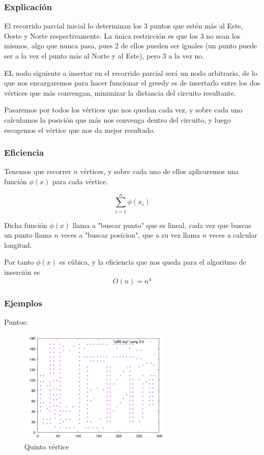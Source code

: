 \subsubsection{Explicación}
El recorrido parcial inicial lo determinan los 3 puntos que estén más al Este, Oeste y Norte respectivamente. La única restricción es que los 3 no sean los mismos, algo que nunca pasa, pues 2 de ellos pueden ser iguales (un punto puede ser a la vez el punto más al Norte y al Este), pero 3 a la vez no.

EL nodo siguiente a insertar en el recorrido parcial será un nodo arbitrario, de lo que nos encargaremos para hacer funcionar el greedy es de insertarlo entre los dos vértices que más convengan, minimizar la distancia del circuito resultante.

Pasaremos por todos los vértices que nos quedan cada vez, y sobre cada uno calculamos la posición que más nos convenga dentro del circuito, y luego escogemos el vértice que nos da mejor resultado.

\subsubsection{Eficiencia}
Tenemos que recorrer $n$ vértices, y sobre cada uno de ellos aplicaremos una función $\phi(x)$ para cada vértice.

\[ \sum_{i=1}^{n} \phi(x_i)\]

Dicha función $\phi(x)$ llama a "buscar punto" que es lineal, cada vez que buscas un punto llama $n$ veces a "buscar posicion", que a su vez llama $n$ veces a calcular longitud.

Por tanto $\phi(x)$ es cúbica, y la eficiencia que nos queda para el algoritmo de inserción es
\[ O(n) = n^4 \]

\newpage
\subsubsection{Ejemplos}
Puntos:

	\begin{figure}[htbH]
		\centering
		\includegraphics[width=0.65\textwidth]{../Viajante/Imagenes/a280.png}
		\caption{Quinto vértice}
	\end{figure}
	
